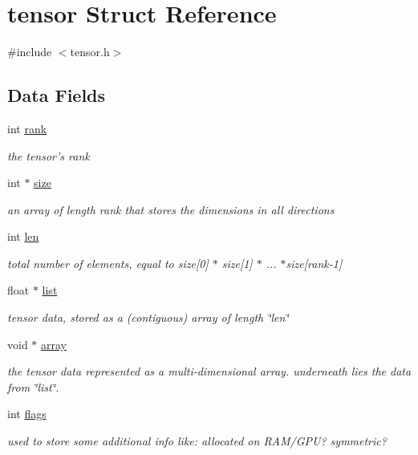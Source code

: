 \hypertarget{structtensor}{
\section{tensor Struct Reference}
\label{structtensor}
}


{\ttfamily \#include $<$tensor.h$>$}

\subsection*{Data Fields}
\begin{DoxyCompactItemize}
\item 
int \hyperlink{structtensor_a7557914487d3688aae0cffa1527446dc}{rank}
\begin{DoxyCompactList}\small\item\em the tensor's rank \item\end{DoxyCompactList}\item 
int $\ast$ \hyperlink{structtensor_ab6fbe3c007384ce983219f08dfb2e7ca}{size}
\begin{DoxyCompactList}\small\item\em an array of length rank that stores the dimensions in all directions \item\end{DoxyCompactList}\item 
int \hyperlink{structtensor_adebc092b0efc1c822fff1c722c65eb09}{len}
\begin{DoxyCompactList}\small\item\em total number of elements, equal to size\mbox{[}0\mbox{]} $\ast$ size\mbox{[}1\mbox{]} $\ast$ ... $\ast$size\mbox{[}rank-\/1\mbox{]} \item\end{DoxyCompactList}\item 
float $\ast$ \hyperlink{structtensor_a6f3380b63c035b9627bdb6dcef03fc1b}{list}
\begin{DoxyCompactList}\small\item\em tensor data, stored as a (contiguous) array of length \char`\"{}len\char`\"{} \item\end{DoxyCompactList}\item 
void $\ast$ \hyperlink{structtensor_a981c1c095b7ef2970dce785c6658285d}{array}
\begin{DoxyCompactList}\small\item\em the tensor data represented as a multi-\/dimensional array. underneath lies the data from \char`\"{}list\char`\"{}. \item\end{DoxyCompactList}\item 
int \hyperlink{structtensor_a382032d59a44e7b1c6d85e545c6140cd}{flags}
\begin{DoxyCompactList}\small\item\em used to store some additional info like: allocated on RAM/GPU? symmetric? \item\end{DoxyCompactList}\end{DoxyCompactItemize}


